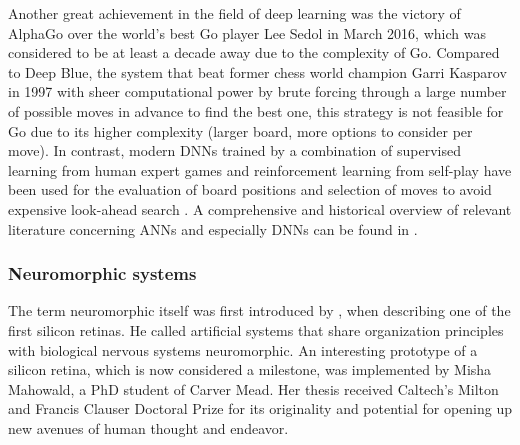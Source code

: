 Another great achievement in the field of deep learning was the victory of AlphaGo \parencite{Silver2016} over the world's best Go player Lee Sedol in March 2016, which was considered to be at least a decade away due to the complexity of Go.
Compared to Deep Blue, the system that beat former chess world champion Garri Kasparov in 1997 \parencite{Hsu2002} with sheer computational power by brute forcing through a large number of possible moves in advance to find the best one, this strategy is not feasible for Go due to its higher complexity (larger board, more options to consider per move).
In contrast, modern \acp{DNN} trained by a combination of supervised learning from human expert games and reinforcement learning from self-play have been used for the evaluation of board positions and selection of moves to avoid expensive look-ahead search \parencite{Silver2016}.
A comprehensive and historical overview of relevant literature concerning \acp{ANN} and especially \acp{DNN} can be found in \textcite{Schmidhuber2015, LeCun2015}.

\subsubsection{Neuromorphic systems}

The term neuromorphic itself was first introduced by \textcite{Mead90}, when describing one of the first silicon retinas.
He called artificial systems that share organization principles with biological nervous systems neuromorphic.
An interesting prototype of a silicon retina, which is now considered a milestone, was implemented by Misha Mahowald, a PhD student of Carver Mead.
Her thesis received Caltech's Milton and Francis Clauser Doctoral Prize for its originality and potential for opening up new avenues of human thought and endeavor.

